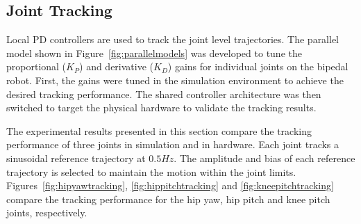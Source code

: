 \subsection{Joint Tracking} %
\label{sub:joint_tracking}
Local PD controllers are used to track the joint level trajectories. The parallel model shown in Figure~\ref{fig:parallelmodels} was developed to tune the proportional ($K_P$) and derivative ($K_D$) gains for individual joints on the bipedal robot. First, the gains were tuned in the simulation environment to achieve the desired tracking performance. The shared controller architecture was then switched to target the physical hardware to validate the tracking results. 

The experimental results presented in this section compare the tracking performance of three joints in simulation and in hardware. Each joint tracks a sinusoidal reference trajectory at $0.5 Hz$. The amplitude and bias of each reference trajectory is selected to maintain the motion within the joint limits. Figures~\ref{fig:hipyawtracking}, \ref{fig:hippitchtracking} and \ref{fig:kneepitchtracking} compare the tracking performance for the hip yaw, hip pitch and knee pitch joints, respectively. 

